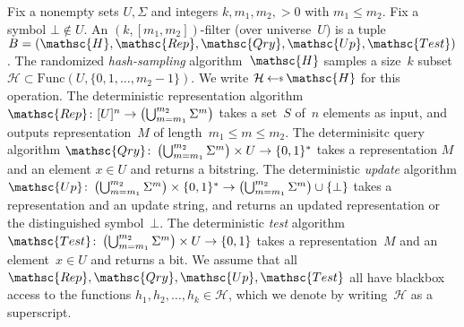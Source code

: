 
Fix a nonempty sets $U,\Sigma$ and integers $k,m_1,m_2,>0$ with $m_1 \leq m_2$.  Fix a symbol $\bot \not\in U$.  An $(k,[m_1,m_2])$-filter (over universe~$U$) is a tuple  $B=(\mathsc{H},\mathsc{Rep},\mathsc{Qry},\mathsc{Up}, \mathsc{Test})$.   
%
The randomized \emph{hash-sampling} algorithm~$\mathsc{H}$ samples a size~$k$ subset~$\mathcal{H} \subset \mathrm{Func}(U,\{0,1,\ldots,m_2-1\})$.  We write $\mathcal{H} \getsr \mathsc{H}$ for this operation.
%
The deterministic representation algorithm $\mathsc{Rep}\colon [U]^n \rightarrow \left(\bigcup_{m=m_1}^{m_2}\Sigma^m\right)$ takes a set~$S$ of~$n$ elements as input, and outputs representation~$M$ of length~$m_1 \leq m \leq m_2$.
%
The determinisitc query algorithm $\mathsc{Qry}\colon \left(\bigcup_{m=m_1}^{m_2}\Sigma^m \right)\times U \rightarrow \bits^*$ takes a representation $M$ and an element $x \in U$ and returns a bitstring.  
%
The deterministic \emph{update} algorithm $\mathsc{Up}\colon \left(\bigcup_{m=m_1}^{m_2}\Sigma^m \right)\times \bits^* \rightarrow \left(\bigcup_{m=m_1}^{m_2}\Sigma^m \right) \cup \{\bot\}$ takes a representation and an update string, and returns an updated representation or the distinguished symbol~$\bot$. 
%
The deterministic \emph{test} algorithm $\mathsc{Test} \colon \left(\bigcup_{m=m_1}^{m_2}\Sigma^m \right) \times U \rightarrow \bits$ takes a representation~$M$ and an element~$x \in U$ and returns a bit.
%
We assume that all $\mathsc{Rep},\mathsc{Qry},\mathsc{Up},\mathsc{Test}$ all have blackbox access to the functions $h_1,h_2,\ldots,h_k \in \mathcal{H}$, which we denote by writing~$\mathcal{H}$ as a superscript.   






